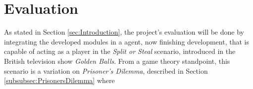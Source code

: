 \section{Evaluation}
\label{sec:Evaluation}
As stated in Section \ref{sec:Introduction}, the project's evaluation will be done by integrating the developed modules in a agent, now finishing development, that is capable of acting as a player in the \textit{Split or Steal} scenario, introduced in the British television show \textit{Golden Balls}\cite{Wikipedia.Golden.Balls}. From a game theory standpoint, this scenario is a variation on \textit{Prisoner's Dilemma}, described in Section \ref{subsubsec:PrisonersDilemma}  where 